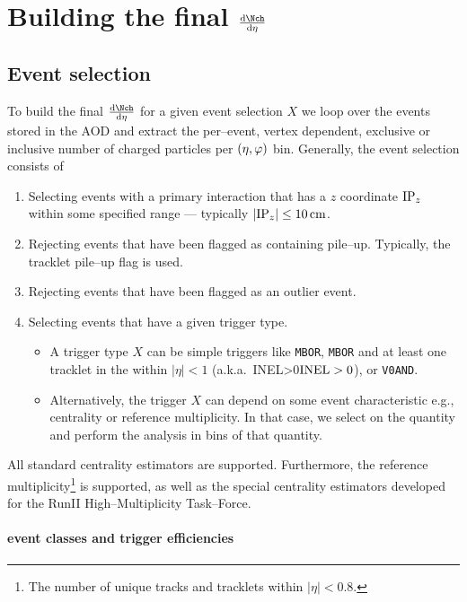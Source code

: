 \documentclass[compat,11pt]{alicenote}
\DeclareRobustCommand{\AlwaysText}[1]{\ifmmode\relax\text{#1}\else #1\fi}
\newcommand*\INEL{\AlwaysText{INEL}}
\newcommand*\INELGT{\ifmmode\INEL>0\else$\INEL>0$\fi}
\newcommand*{\etaphi}{\ensuremath(\eta,\varphi)}
\newcommand{\AOD}{\AlwaysText{AOD}}
\begin{document}
\clearpage
\section{Building the final $\dndeta$}
\label{sec:ana_aod}

\subsection{Event selection}

To build the final $\dndeta$ for a given event selection $X$ we loop
over the events stored in the \AOD{} and extract the per--event,
vertex dependent, exclusive or inclusive number of charged particles
per $\etaphi$ bin.   Generally, the event selection consists of 

\begin{enumerate}
\item Selecting events with a primary interaction that has a $z$
  coordinate $\IPz$ within some specified range --- typically
  $|\IPz|\le\unit[10]{cm}$. 
\item Rejecting events that have been flagged as containing pile--up.
  Typically, the \SPD{} tracklet pile--up flag is used. 
\item Rejecting events that have been flagged as an \SPD{} outlier
  event. 
\item Selecting events that have a given trigger type.
  \begin{itemize}
  \item A trigger type $X$ can be simple triggers like \texttt{MBOR},
    \texttt{MBOR} and at least one tracklet in the \SPD{} within
    $|\eta|<1$ (a.k.a.~\INELGT{}), or \texttt{V0AND}. 
  \item Alternatively, the trigger $X$ can depend on some event
    characteristic e.g., centrality or reference multiplicity. In that
    case, we select on the quantity and perform the analysis in bins
    of that quantity.
  \end{itemize}
\end{enumerate}

All standard centrality estimators are supported.  Furthermore, the
reference multiplicity\footnote{The number of unique tracks and
  tracklets within $|\eta|<0.8$.} is supported, as well as the special
\ppCol{} centrality estimators developed for the RunII
High--Multiplicity Task--Force.

\paragraph{\ppCol{} event classes and trigger efficiencies} 
\end{document}
